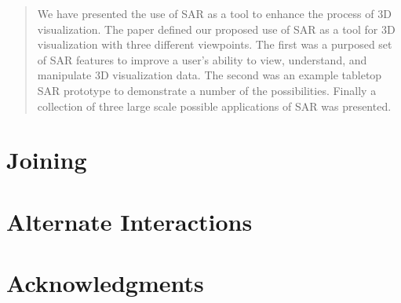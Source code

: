 \documentclass{sig-alternate}
\begin{document}
\begin{quote}
We have presented the use of SAR as a tool to enhance the process of 3D visualization. The paper defined our proposed use of SAR as a tool for 3D visualization with three different viewpoints. The first was a purposed set of SAR features to improve a user's ability to view, understand, and manipulate 3D visualization data. The second was an example tabletop SAR prototype to demonstrate a number of the possibilities. Finally a collection of three large scale possible applications of SAR was presented.
\end{quote}


\section{Joining}
\label{sec:Joining}

\section{Alternate Interactions}
\label{sec:Alternate Interactions}

\section{Acknowledgments}
\label{sec:Acknowledgments}



\end{document}
